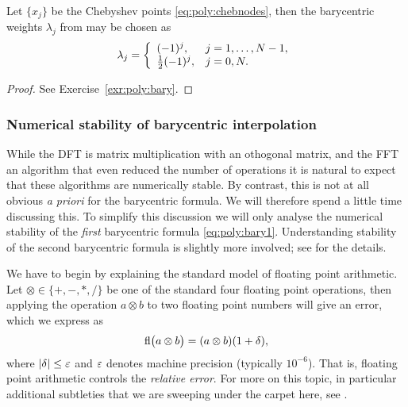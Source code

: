 \begin{theorem}
   \label{th:poly:barycheb}
   Let $\{x_j\}$ be the Chebyshev points \eqref{eq:poly:chebnodes}, then 
   the barycentric weights $\lambda_j$ from  
   may be chosen as 
   \[
       \lambda_j = \left\{ \begin{array}{ll}  
          (-1)^j, & j = 1, \dots, N-1, \\ 
          \frac12 (-1)^j, & j = 0, N.  \end{array} \right.
   \]
\end{theorem}
\begin{proof}
   See Exercise~\ref{exr:poly:bary}. 
\end{proof}

\subsubsection{Numerical stability of barycentric interpolation}
%
\label{sec:poly:barystab}
%
While the DFT is matrix multiplication with an othogonal matrix, and the FFT 
an algorithm that even reduced the number of operations it is natural to 
expect that these algorithms are numerically stable. By contrast, this is 
not at all obvious {\it a priori} for the barycentric formula. We will therefore 
spend a little time discussing this. 
%
To simplify this discussion we will only analyse the numerical stability 
of the {\em first} barycentric formula \eqref{eq:poly:bary1}. Understanding 
stability of the second barycentric formula is slightly more involved; 
see \cite{Higham2004-fn} for the details. 

We have to begin by explaining the standard model of floating point arithmetic. 
Let $\otimes \in \{ +, -, *,  / \}$ be one of the standard four floating point 
operations, then applying the operation $a \otimes b$  to two floating point
numbers will give an error, which we express as 
\[
   {\rm fl}\big( a \otimes b \big) = (a\otimes b)(1+\delta),
\]
where $|\delta| \leq \varepsilon$ and $\varepsilon$ denotes machine precision (typically
$10^{-6}$). That is, floating point arithmetic controls the {\em relative
error}. For more on this topic, in particular additional subtleties that we are
sweeping under the carpet here, see \cite{Higham2002-nk}.


